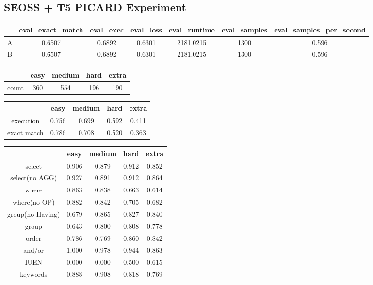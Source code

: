 \subsection{SEOSS + T5 PICARD Experiment}

\begin{tabular}{|c|c|c|c|c|c|c|}
    \hline
      & eval\_exact\_match & eval\_exec & eval\_loss & eval\_runtime & eval\_samples & eval\_samples\_per\_second \\ \hline
    A & 0.6507             & 0.6892     & 0.6301     & 2181.0215     & 1300          & 0.596                      \\ \hline
    B & 0.6507             & 0.6892     & 0.6301     & 2181.0215     & 1300          & 0.596                      \\ \hline
\end{tabular}

\begin{tabular}{|c|c|c|c|c|}
    \hline
          & easy & medium & hard & extra \\ \hline
    count & 360  & 554    & 196  & 190   \\ \hline
\end{tabular}

\begin{tabular}{|c|c|c|c|c|}
    \hline
                & easy  & medium & hard  & extra \\ \hline
    execution   & 0.756 & 0.699  & 0.592 & 0.411 \\ \hline
    exact match & 0.786 & 0.708  & 0.520 & 0.363 \\ \hline
\end{tabular}

\begin{tabular}{|c|c|c|c|c|}
    \hline
                     & easy  & medium & hard  & extra \\ \hline
    select           & 0.906 & 0.879  & 0.912 & 0.852 \\ \hline
    select(no AGG)   & 0.927 & 0.891  & 0.912 & 0.864 \\ \hline
    where            & 0.863 & 0.838  & 0.663 & 0.614 \\ \hline
    where(no OP)     & 0.882 & 0.842  & 0.705 & 0.682 \\ \hline
    group(no Having) & 0.679 & 0.865  & 0.827 & 0.840 \\ \hline
    group            & 0.643 & 0.800  & 0.808 & 0.778 \\ \hline
    order            & 0.786 & 0.769  & 0.860 & 0.842 \\ \hline
    and/or           & 1.000 & 0.978  & 0.944 & 0.863 \\ \hline
    IUEN             & 0.000 & 0.000  & 0.500 & 0.615 \\ \hline
    keywords         & 0.888 & 0.908  & 0.818 & 0.769 \\ \hline
\end{tabular}

